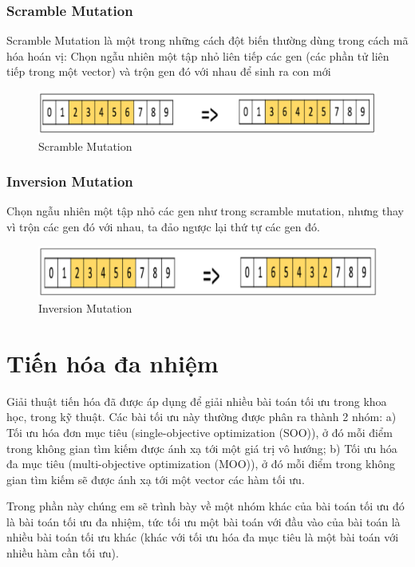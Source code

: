 \documentclass[a4paper,12pt]{report}
\begin{document}
\subsubsection{Scramble Mutation}
Scramble Mutation là một trong những cách đột biến thường dùng trong cách mã hóa hoán vị: Chọn ngẫu nhiên một tập nhỏ liên tiếp các gen (các phần tử liên tiếp trong một vector) và trộn gen đó với nhau để sinh ra con mới
\begin{figure}[H]
\centering 
\includegraphics[scale=0.4]{scramble_mutation.png}
\caption{Scramble Mutation}
\end{figure}

\subsubsection{Inversion Mutation}
Chọn ngẫu nhiên một tập nhỏ các gen như trong scramble mutation, nhưng thay vì trộn các gen đó với nhau, ta đảo ngược lại thứ tự các gen đó.
\begin{figure}[H]
\centering 
\includegraphics[scale=0.4]{inversion_mutation.png}
\caption{Inversion Mutation}
\end{figure}

\section{Tiến hóa đa nhiệm}
Giải thuật tiến hóa đã được áp dụng để giải nhiều bài toán tối ưu trong khoa học, trong kỹ thuật. Các bài tối ưu này thường được phân ra thành 2 nhóm: a) Tối ưu hóa đơn mục tiêu (single-objective optimization (SOO)), ở đó mỗi điểm trong không gian tìm kiếm được ánh xạ tới một giá trị vô hướng; b) Tối ưu hóa đa mục tiêu (multi-objective optimization (MOO)), ở đó mỗi điểm trong không gian tìm kiếm sẽ được ánh xạ tới một vector các hàm tối ưu. 
\par Trong phần này chúng em sẽ trình bày về một nhóm khác của bài toán tối ưu đó là bài toán tối ưu đa nhiệm, tức tối ưu một bài toán với đầu vào của bài toán là nhiều bài toán tối ưu khác (khác với tối ưu hóa đa mục tiêu là một bài toán với nhiều hàm cần tối ưu).
\end{document}
